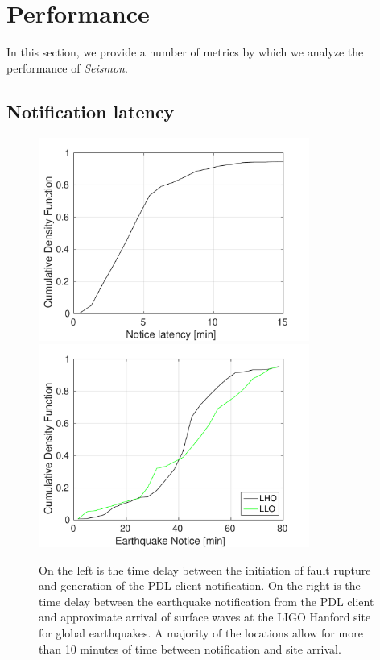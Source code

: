 \documentclass[twocolumn, prl, superscriptaddress]{revtex4}
\begin{document}
\section{Performance}
\label{sec:performance}

In this section, we provide a number of metrics by which we analyze the performance of \emph{Seismon}.

\subsection{Notification latency}

\begin{figure}[t]
\hspace*{-0.5cm}
 \includegraphics[width=3.5in]{earthquake_notice.pdf}
 \includegraphics[width=3.5in]{lockloss_notice.pdf}
 \caption{On the left is the time delay between the initiation of fault rupture and generation of the PDL client notification. On the right is the time delay between the earthquake notification from the PDL client and approximate arrival of surface waves at the LIGO Hanford site for global earthquakes. A majority of the locations allow for more than 10 minutes of time between notification and site arrival.}
 \label{fig:delays}
\end{figure}
\end{document}
